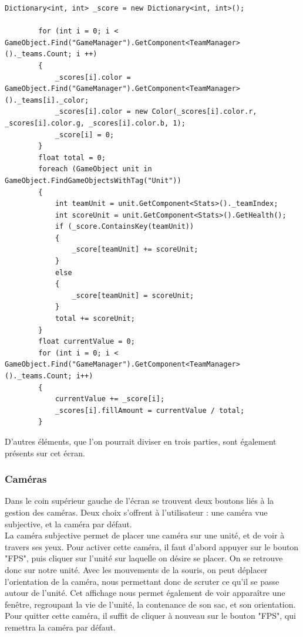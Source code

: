 \documentclass{report}
\begin{document}
\begin{lstlisting}[language={[Sharp]C},label={lst:Update()}, caption= Extrait du code de ScriptHUD.cs]
Dictionary<int, int> _score = new Dictionary<int, int>();
        
        for (int i = 0; i < GameObject.Find("GameManager").GetComponent<TeamManager>()._teams.Count; i ++)
        {
            _scores[i].color = GameObject.Find("GameManager").GetComponent<TeamManager>()._teams[i]._color;
            _scores[i].color = new Color(_scores[i].color.r, _scores[i].color.g, _scores[i].color.b, 1);
            _score[i] = 0;
        }
        float total = 0;
        foreach (GameObject unit in GameObject.FindGameObjectsWithTag("Unit"))
        {
            int teamUnit = unit.GetComponent<Stats>()._teamIndex;
            int scoreUnit = unit.GetComponent<Stats>().GetHealth();
            if (_score.ContainsKey(teamUnit))
            {
                _score[teamUnit] += scoreUnit;
            }
            else
            {
                _score[teamUnit] = scoreUnit;
            }
            total += scoreUnit;
        }
        float currentValue = 0;
        for (int i = 0; i < GameObject.Find("GameManager").GetComponent<TeamManager>()._teams.Count; i++)
        {
            currentValue += _score[i];
            _scores[i].fillAmount = currentValue / total;
        }
\end{lstlisting}	

D'autres éléments, que l'on pourrait diviser en trois parties, sont également présents sur cet écran.


\subsubsection{Caméras}
Dans le coin supérieur gauche de l'écran se trouvent deux boutons liés à la gestion des caméras.
Deux choix s'offrent à l'utilisateur : une caméra vue subjective, et la caméra par défaut.\\
La caméra subjective permet de placer une caméra sur une unité, et de voir à travers ses yeux. Pour activer cette caméra, il faut d'abord appuyer sur le bouton "FPS", puis cliquer sur l'unité sur laquelle on désire se placer. On se retrouve donc sur notre unité. Avec les mouvements de la souris, on peut déplacer l'orientation de la caméra, nous permettant donc de scruter ce qu'il se passe autour de l'unité.
Cet affichage nous permet également de voir apparaître une fenêtre, regroupant la vie de l’unité, la contenance de son sac, et son orientation.
Pour quitter cette caméra, il suffit de cliquer à nouveau sur le bouton "FPS", qui remettra la caméra par défaut.
\end{document}
